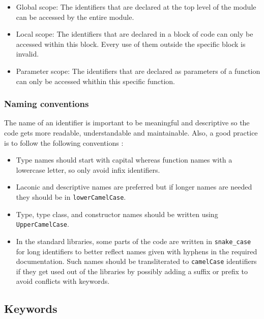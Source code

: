 \documentclass[a4paper, titlepage, twoside]{article}
\begin{document}
\begin{itemize}
\item Global scope: The identifiers that are declared at the top level of the module can be accessed by the entire module.

\item Local scope: The identifiers that are declared in a block of code can only be accessed within this block. Every use of them outside the specific block is invalid.

\item Parameter scope: The identifiers that are declared as parameters of a function can only be accessed whithin this specific function.
\end{itemize}

\subsubsection{Naming conventions}
\label{sec:org1eea835}

The name of an identifier is important to be meaningful and descriptive so the code gets more readable, understandable and maintainable. Also, a good practice is to follow the following conventions \autocite{haskellwikiProgrammingGuidelinesHaskellWiki2022}:

\begin{itemize}
\item Type names should start with capital whereas function names with a lowercase letter, so only avoid infix identifiers.

\item Laconic and descriptive names are preferred but if longer names are needed they should be in \texttt{lowerCamelCase}.

\item Type, type class, and constructor names should be written using \texttt{UpperCamelCase}.

\item In the standard libraries, some parts of the code are written in \texttt{snake\_case} for long identifiers to better reflect names given with hyphens in the required documentation. Such names should be transliterated to \texttt{camelCase} identifiers if they get used out of the libraries by possibly adding a suffix or prefix to avoid conflicts with keywords.
\end{itemize}

\subsection{Keywords}
\label{sec:orgb575c95}
\end{document}
